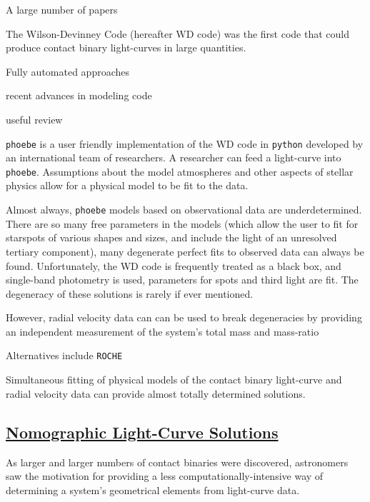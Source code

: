 \documentclass[12pt]{article} %
\numberwithin{equation}{section} %
\begin{document}
A large number of papers 

The Wilson-Devinney Code (hereafter WD code)  was the first code that could produce contact binary light-curves in large quantities. 

Fully automated approaches \citep{prsa2009fully} \citep{prsa2008artificial}

recent advances in modeling code \citep{prvsa2013physics}

useful review \citep{gimenez2006close}

\texttt{phoebe} is a user friendly implementation of the WD code in \texttt{python} developed by an international team of researchers. A researcher can feed a light-curve into \texttt{phoebe}. Assumptions about the model atmospheres and other aspects of stellar physics allow for a physical model to be fit to the data.

Almost always, \texttt{phoebe} models based on observational data are underdetermined. There are so many free parameters in the models (which allow the user to fit for starspots of various shapes and sizes, and include the light of an unresolved tertiary component), many degenerate perfect fits to observed data can always be found. Unfortunately, the WD code is frequently treated as a black box, and single-band photometry is used, parameters for spots and third light are fit. The degeneracy of these solutions is rarely if ever mentioned. 

However, radial velocity data can can be used to break degeneracies by providing an independent measurement of the system's total mass and mass-ratio 

Alternatives include \texttt{ROCHE}  \citep{pribulla2012roche}

Simultaneous fitting of physical models of the contact binary light-curve and radial velocity data can provide almost totally determined solutions. 

\subsection[Nomographic Light-Curve Solutions]{\hyperlink{toc}{Nomographic Light-Curve Solutions}} \label{sec: Nomographic Light-Curve Solutions}

As larger and larger numbers of contact binaries were discovered, astronomers saw the motivation for providing a less computationally-intensive way of determining a system's geometrical elements from light-curve data.
\end{document}
